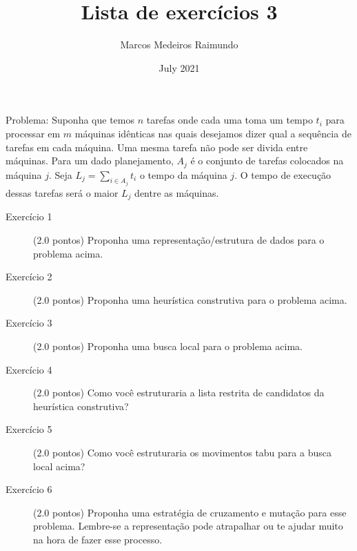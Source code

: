 \documentclass{article}
\title{Lista de exercícios 3}
\author{Marcos Medeiros Raimundo}
\date{July 2021}
\begin{document}
\maketitle

Problema: Suponha que temos $n$ tarefas onde cada uma toma um tempo $t_i$ para processar em $m$ máquinas idênticas nas quais desejamos dizer qual a sequência de tarefas em cada máquina. Uma mesma tarefa não pode ser divida entre máquinas. Para um dado planejamento, $A_j$ é o conjunto de tarefas colocados na máquina $j$. Seja $L_j = \sum_{i \in A_j} t_i$ o tempo da máquina $j$. O tempo de execução dessas tarefas será o maior $L_j$ dentre as máquinas.

\begin{description}

\item[Exercício 1] (2.0 pontos) Proponha uma representação/estrutura de dados para o problema acima.

\item[Exercício 2] (2.0 pontos) Proponha uma heurística construtiva para o problema acima.

\item[Exercício 3] (2.0 pontos) Proponha uma busca local para o problema acima.

\item[Exercício 4] (2.0 pontos) Como você estruturaria a lista restrita de candidatos da heurística construtiva?

\item[Exercício 5] (2.0 pontos) Como você estruturaria os movimentos tabu para a busca local acima?

\item[Exercício 6] (2.0 pontos) Proponha uma estratégia de cruzamento e mutação para esse problema. Lembre-se a representação pode atrapalhar ou te ajudar muito na hora de fazer esse processo.
\end{description}
\end{document}
